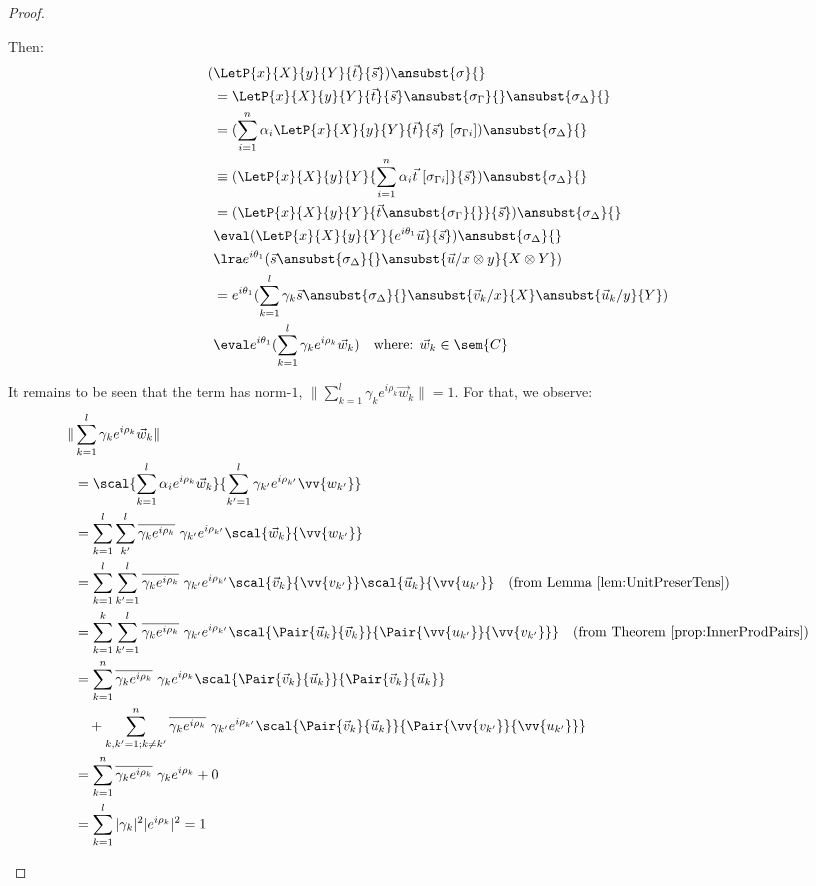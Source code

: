 \begin{proof}
\begin{description}
    Then:
    \begin{align*}
        (&\LetP{x}{X}{y}{Y}{\vec{t}}{\vec{s}})\ansubst{\sigma}{} \\
        &= \LetP{x}{X}{y}{Y}{\vec{t}}{\vec{s}}\ansubst{\sigma_\Gamma}{}\ansubst{\sigma_\Delta}{}\\
        &=(\sum_{i=1}^{n}\alpha_i\LetP{x}{X}{y}{Y}{\vec{t}}{\vec{s}}\ [\sigma_{\Gamma i}])\ansubst{\sigma_{\Delta}}{}\\
        &\equiv (\LetP{x}{X}{y}{Y}{\sum_{i=1}^{n}\alpha_i\vec{t}\ [\sigma_{\Gamma i}]}{\vec{s}})\ansubst{\sigma_\Delta}{}\\
        &=(\LetP{x}{X}{y}{Y}{\vec{t}\ansubst{\sigma_\Gamma}{}}{\vec{s}})\ansubst{\sigma_\Delta}{}\\
        &\eval(\LetP{x}{X}{y}{Y}{e^{i\theta_1}\vec{u}}{\vec{s}})\ansubst{\sigma_\Delta}{}\\
        &\lra e^{i\theta_1}(\vec{s}\ansubst{\sigma_\Delta}{}\ansubst{\vec{u}/x\otimes y}{X\otimes Y})\\
        &=e^{i\theta_1} (\sum_{k=1}^{l}\gamma_k\vec{s}\ansubst{\sigma_\Delta}{}\ansubst{\vec{v}_{k}/x}{X}\ansubst{\vec{u}_{k}/y}{Y})\\
        &\eval e^{i\theta_1} (\sum_{k=1}^{l}\gamma_k e^{i\rho_k} \vec{w}_{k})\quad\text{where: }\vec{w}_{k}\in\sem{C}
    \end{align*}

    It remains to be seen that the term has norm-$1$, $\|\sum_{k=1}^{l}\gamma_k e^{i\rho_k} \vec{w}_{k}\|=1$. For that, we observe:
    \begin{align*}
        \|&\sum_{k=1}^{l}\gamma_k e^{i\rho_k} \vec{w}_{k}\| \\
        &= \scal{\sum_{k=1}^{l}\alpha_i e^{i\rho_k} \vec{w}_{k}}{\sum_{k'=1}^{l}\gamma_{k'} e^{i\rho_{k'}} \vv{w_{k'}}}\\
        &= \sum_{k=1}^{l}\sum_{k'}^{l}\overline{\gamma_k e^{i\rho_k}}\  \gamma_{k'} e^{i\rho_{k'}}\scal{\vec{w}_{k}}{\vv{w_{k'}}}\\
        &=\sum_{k=1}^{l}\sum_{k'=1}^{l}\overline{\gamma_k e^{i\rho_k}}\ \gamma_{k'} e^{i\rho_{k'}} \scal{\vec{v}_{k}}{\vv{v_{k'}}}\scal{\vec{u}_{k}}{\vv{u_{k'}}}\quad(\text{from Lemma~\ref{lem:UnitPreserTens}})\\
        &= \sum_{k=1}^{k}\sum_{k'=1}^{l}\overline{\gamma_k e^{i\rho_k}}\  \gamma_{k'} e^{i\rho_{k'}} \scal{\Pair{\vec{u}_{k}}{\vec{v}_{k}}}{\Pair{\vv{u_{k'}}}{\vv{v_{k'}}}}\quad(\text{from Theorem~\ref{prop:InnerProdPairs}})\\
        &=\sum_{k=1}^n \overline{\gamma_k e^{i\rho_k}}\ \gamma_k e^{i\rho_k} \scal{\Pair{\vec{v}_{k}}{\vec{u}_{k}}}{\Pair{\vec{v}_{k}}{\vec{u}_{k}}} \\
        & \quad + \sum_{k,k'=1; k\neq k'}^n \overline{\gamma_k e^{i\rho_k}}\  \gamma_{k'} e^{i\rho_{k'}} \scal{\Pair{\vec{v}_{k}}{\vec{u}_{k}}}{\Pair{\vv{v_{k'}}}{\vv{u_{k'}}}}\\
        &= \sum_{k=1}^n \overline{\gamma_k e^{i\rho_k}}\ \gamma_k e^{i\rho_k} + 0 \\
        &= \sum_{k=1}^{l} |\gamma_k|^2 |e^{i\rho_k}|^2 = 1
    \end{align*}


\end{description}
\end{proof}
